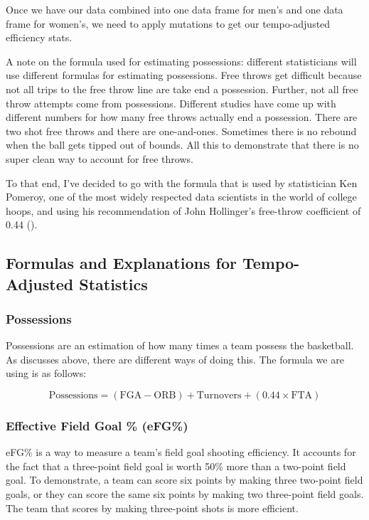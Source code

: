 \documentclass[
]{article}
\begin{document}
Once we have our data combined into one data frame for men's and one
data frame for women's, we need to apply mutations to get our
tempo-adjusted efficiency stats.

A note on the formula used for estimating possessions: different
statisticians will use different formulas for estimating possessions.
Free throws get difficult because not all trips to the free throw line
are take end a possession. Further, not all free throw attempts come
from possessions. Different studies have come up with different numbers
for how many free throws actually end a possession. There are two shot
free throws and there are one-and-ones. Sometimes there is no rebound
when the ball gets tipped out of bounds. All this to demonstrate that
there is no super clean way to account for free throws.

To that end, I've decided to go with the formula that is used by
statistician Ken Pomeroy, one of the most widely respected data
scientists in the world of college hoops, and using his recommendation
of John Hollinger's free-throw coefficient of 0.44
().

\subsection{Formulas and Explanations for Tempo-Adjusted
Statistics}\label{formulas-and-explanations-for-tempo-adjusted-statistics}

\subsubsection{Possessions}\label{possessions}

Possessions are an estimation of how many times a team possess the
basketball. As discusses above, there are different ways of doing this.
The formula we are using is as follows:

\[
\text{Possessions} = (\text{FGA} - \text{ORB}) + \text{Turnovers} + (0.44 \times \text{FTA})
\]

\subsubsection{Effective Field Goal \%
(eFG\%)}\label{effective-field-goal-efg}

eFG\% is a way to measure a team's field goal shooting efficiency. It
accounts for the fact that a three-point field goal is worth 50\% more
than a two-point field goal. To demonstrate, a team can score six points
by making three two-point field goals, or they can score the same six
points by making two three-point field goals. The team that scores by
making three-point shots is more efficient.
\end{document}
